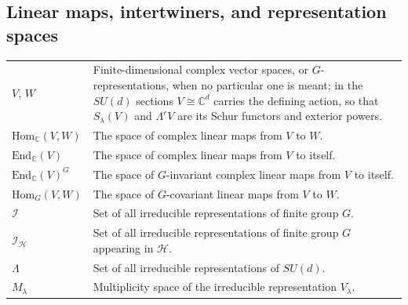 \documentclass[11pt,letterpaper]{article}
\theoremstyle{plain}
\theoremstyle{plain}
\theoremstyle{plain}
\theoremstyle{plain}
\theoremstyle{plain}
\theoremstyle{plain}
\newcommand{\C}{\mathbb{C}}
\newcommand{\End}{\mathrm{End}}
\newcommand{\Hom}{\mathrm{Hom}}
\theoremstyle{plain}
\theoremstyle{definition}
\theoremstyle{plain}
\begin{document}
\subsection*{Linear maps, intertwiners, and representation spaces}

\begin{tabular}{@{}ll@{}}

\parbox[t]{0.22\textwidth}{$V$, $W$} & \parbox[t]{0.72\textwidth}{Finite-dimensional complex vector spaces, or $G$-representations, when no particular one is meant; in the $SU(d)$ sections $V\cong\mathbb C^d$ carries the defining action, so that $S_\lambda(V)$ and $\Lambda^rV$ are its Schur functors and exterior powers.} \\[0.6em]

\parbox[t]{0.22\textwidth}{$\Hom_{\C}(V, W)$} & \parbox[t]{0.72\textwidth}{The space of complex linear maps from $V$ to $W$.} \\[0.6em]

\parbox[t]{0.22\textwidth}{$\End_{\C}(V)$} & \parbox[t]{0.72\textwidth}{The space of complex linear maps from $V$ to itself.} \\[0.6em]

\parbox[t]{0.22\textwidth}{$\End_{\C}(V)^G$} & \parbox[t]{0.72\textwidth}{The space of $G$-invariant complex linear maps from $V$ to itself.} \\[0.6em]

\parbox[t]{0.22\textwidth}{$\Hom_G(V, W)$} & \parbox[t]{0.72\textwidth}{The space of $G$-covariant linear maps from $V$ to $W$.} \\[0.6em]

\parbox[t]{0.22\textwidth}{$\mathcal{I}$} & \parbox[t]{0.72\textwidth}{Set of all irreducible representations of finite group $G$.} \\[0.6em]

\parbox[t]{0.22\textwidth}{$\mathcal{I}_{\mathcal{H}}$} & \parbox[t]{0.72\textwidth}{Set of all irreducible representations of finite group $G$ appearing in $\mathcal{H}$.} \\[0.6em]

\parbox[t]{0.22\textwidth}{$\Lambda$} & \parbox[t]{0.72\textwidth}{Set of all irreducible representations of $SU(d)$.} \\[0.6em]

\parbox[t]{0.22\textwidth}{$M_{\lambda}$} & \parbox[t]{0.72\textwidth}{Multiplicity space of the irreducible representation $V_{\lambda}$.} \\[0.6em]


\end{tabular}
\end{document}
